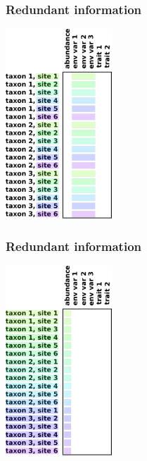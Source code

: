 \documentclass{beamer}
\numberwithin{exercise}{section}
\begin{document}
\begin{frame}
\frametitle{Redundant information}
\begin{center}
\includegraphics[width=4cm]{forthcorner2dataframeREPEAT2}
\end{center}
\end{frame}

\begin{frame}
\frametitle{Redundant information}
\begin{center}
\includegraphics[width=4cm]{forthcorner2dataframeREPEAT1}
\end{center}
\end{frame}

%
\end{document}
